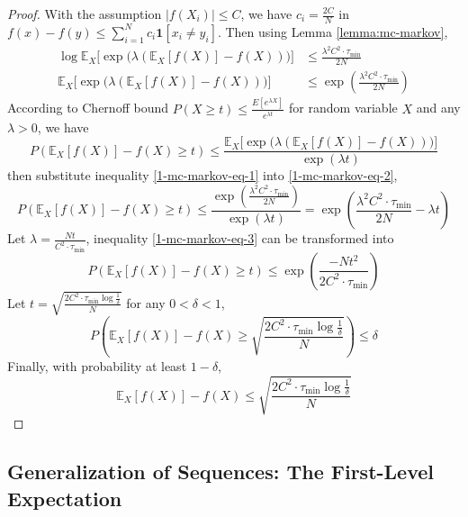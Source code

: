 \begin{proof}
	With the assumption $|f(X_i)| \leq C$, we have $c_i=\frac{2C}{N}$ in $f(x)-f(y)\leq\sum_{i=1}^Nc_i \bm{1}[x_i\neq y_i]$. Then using Lemma \ref{lemma:mc-markov},
	\begin{align}
		\log\mathbb{E}_X\Big[\exp\big(\lambda(\mathbb{E}_X[f(X)]-f(X))\big)\Big]&\leq\frac{\lambda^2C^2\cdot \tau_{\min}}{2N} \nonumber\\
		\mathbb{E}_X\Big[\exp\big(\lambda(\mathbb{E}_X[f(X)]-f(X))\big)\Big]&\leq\exp\left(\frac{\lambda^2 C^2\cdot \tau_{\min}}{2N}\right) \label{1-mc-markov-eq-1}
	\end{align}
	According to Chernoff bound $P(X \geq t)\leq \frac{E[e^{\lambda X}]}{e^{\lambda t}}$ for random variable $X$ and any $\lambda>0$, we have
	\begin{equation}\label{1-mc-markov-eq-2}
		P{\left(\mathbb{E}_X[f(X)]-f(X)\geq t \right)}\leq \frac{\mathbb{E}_X\Big[\exp\big(\lambda(\mathbb{E}_X[f(X)]-f(X))\big)\Big]}{\exp\left({\lambda t}\right)} 
	\end{equation}
	then substitute inequality \ref{1-mc-markov-eq-1} into \ref{1-mc-markov-eq-2},
	\begin{equation}\label{1-mc-markov-eq-3}
		P{\left(\mathbb{E}_X[f(X)]-f(X) \geq t \right)}\leq \frac{\exp\left(\frac{\lambda^2 C^2\cdot \tau_{\min}}{2N}\right)}{\exp\left({\lambda t}\right)}=\exp\left(\frac{\lambda^2 C^2\cdot \tau_{\min}}{2N}-\lambda t\right)
	\end{equation}
	Let $\lambda=\frac{Nt}{C^2 \cdot \tau_{\min}}$, inequality \ref{1-mc-markov-eq-3} can be transformed into
	$$
	P{\left(\mathbb{E}_X[f(X)]-f(X) \geq t \right)}\leq \exp\left(\frac{-N t^2}{2C^2\cdot \tau_{\min}}\right)
	$$
	Let $t=\sqrt{\frac{2C^2 \cdot \tau_{\min} \log \frac{1}{\delta}}{N}}$ for any $0 < \delta < 1$, 
	$$
	P{\left(\mathbb{E}_X[f(X)]- f(X) \geq \sqrt{\frac{2C^2 \cdot \tau_{\min} \log \frac{1}{\delta}}{N}} \right)}\leq \delta
	$$
	Finally, with probability at least $1-\delta$,
	$$
	\mathbb{E}_X[f(X)] -f(X) \leq \sqrt{\frac{2C^2 \cdot \tau_{\min} \log \frac{1}{\delta}}{N}}
	$$
\end{proof}

\subsection{Generalization of Sequences: The First-Level Expectation}
